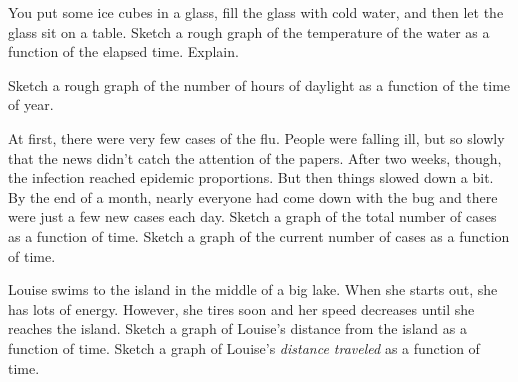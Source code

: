 \documentclass{ximera}
\begin{document}
\begin{question} 
You put some ice cubes in a glass, fill the glass with cold water, and then let the glass sit on a table.  Sketch a rough graph of the temperature of the water as a function of the elapsed time.  Explain.
\end{question}
\begin{question}
Sketch a rough graph of the number of hours of daylight as a function of the time of year.
\end{question}	
\begin{question} 
At first, there were very few cases of the flu.  People were falling ill, but so slowly that the news didn't catch the attention of the papers.  After two weeks, though, the infection reached epidemic proportions.  But then things slowed down a bit.  By the end of a month, nearly everyone had come down with the bug and there were just a few new cases each day.  Sketch a graph of the total number of cases as a function of time.  Sketch a graph of the current number of cases as a function of time.
\end{question}
\begin{question} 
Louise swims to the island in the middle of a big lake.  When she starts out, she has lots of energy.  However, she tires soon and her speed decreases until she reaches the island.  Sketch a graph of Louise's distance from the island as a function of time.  Sketch a graph of Louise's {\em distance traveled} as a function of time.
\end{question}
\end{document}
